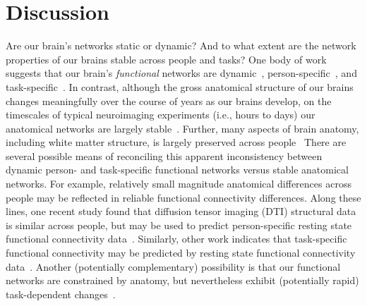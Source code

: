 \documentclass[11pt]{article}
\begin{document}
\section*{Discussion}
Are our brain's networks static or dynamic?  And to what extent are
the network properties of our brains stable across people and tasks?
One body of work suggests that our brain's \textit{functional}
networks are dynamic~\citep[e.g., ][]{MannEtal18},
person-specific~\citep[e.g., ][]{FinnEtal15}, and
task-specific~\citep[e.g., ][]{Turk13}.  In contrast, although the
gross anatomical structure of our brains changes meaningfully over the
course of years as our brains develop, on the timescales of typical
neuroimaging experiments (i.e., hours to days) our anatomical networks
are largely stable~\citep[e.g., ][]{CaseEtal00}.  Further, many
aspects of brain anatomy, including white matter structure, is largely
preserved across people~\citep[e.g., ][]{TalaTour88, JahaEtal13,
  MoriEtal08} There are several possible means of reconciling this
apparent inconsistency between dynamic person- and task-specific
functional networks versus stable anatomical networks.  For example,
relatively small magnitude anatomical differences across people may be
reflected in reliable functional connectivity differences.  Along
these lines, one recent study found that diffusion tensor imaging
(DTI) structural data is similar across people, but may be used to
predict person-specific resting state functional connectivity
data~\citep{BeckEtal18}.  Similarly, other work indicates that
task-specific functional connectivity may be predicted by resting
state functional connectivity data~\citep{ColeEtal16, TavoEtal16}.  Another
(potentially complementary) possibility is that our functional
networks are constrained by anatomy, but nevertheless exhibit
(potentially rapid) task-dependent changes~\citep[e.g.,
][]{SporBetz16}.
\end{document}
